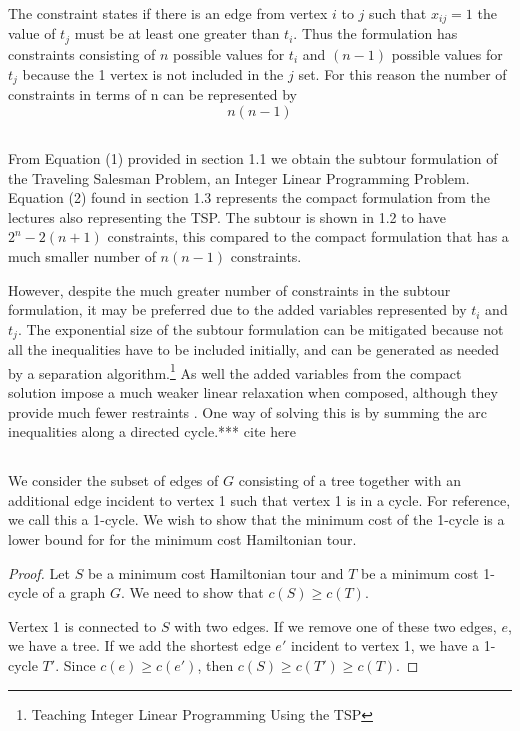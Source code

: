 \documentclass[11pt,a4paper,english]{article}
\begin{document}
The constraint states if there is an edge from vertex $i$ to $j$ such that $x_{ij} = 1$ the value of $t_{j}$ must be at least one greater than $t_{i}$. Thus the formulation has constraints consisting of $n$ possible values for $t_{i}$ and $(n-1)$ possible values for $t_{j}$ because the 1 vertex is not included in the $j$ set. For this reason the number of constraints in terms of n can be represented by $$n(n-1)$$

\subsection{}
From Equation (1) provided in section 1.1 we obtain the subtour formulation of the Traveling Salesman Problem, an Integer Linear Programming Problem.
Equation (2) found in section 1.3 represents the compact formulation from the lectures also representing the TSP. The subtour is shown in 1.2 to have $2^n - 2(n+1)$ constraints, this compared to the compact formulation that has a much smaller number of $n(n-1)$ constraints. 

However, despite the much greater number of constraints in the subtour formulation, it may be preferred due to the added variables represented by $t_{i}$ and $t_{j}$. The exponential size of the subtour formulation can be mitigated because not all the inequalities have to be included initially, and can be generated as needed by a separation algorithm.\footnote{Teaching Integer Linear Programming Using the TSP}
As well the added variables from the compact solution impose a much weaker linear relaxation when composed, although they provide much fewer restraints . One way of solving this is by summing the arc inequalities along a directed cycle.*** cite here

\subsection{}
We consider the subset of edges of $G$ consisting of a tree together with an additional edge incident to vertex 1 such that vertex 1 is in a cycle. For reference, we call this a 1-cycle. We wish to show that the minimum cost of the 1-cycle is a lower bound for for the minimum cost Hamiltonian tour.

\begin{proof}
Let $S$ be a minimum cost Hamiltonian tour and $T$ be a minimum cost 1-cycle of a graph $G$. We need to show that $c(S) \geq c(T)$.

Vertex 1 is connected to $S$ with two edges. If we remove one of these two edges, $e$, we have a tree. If we add the shortest edge $e'$ incident to vertex 1, we have a 1-cycle $T'$. Since $c(e) \geq c(e')$, then $c(S) \geq c(T') \geq c(T)$.
\end{proof}
\end{document}
